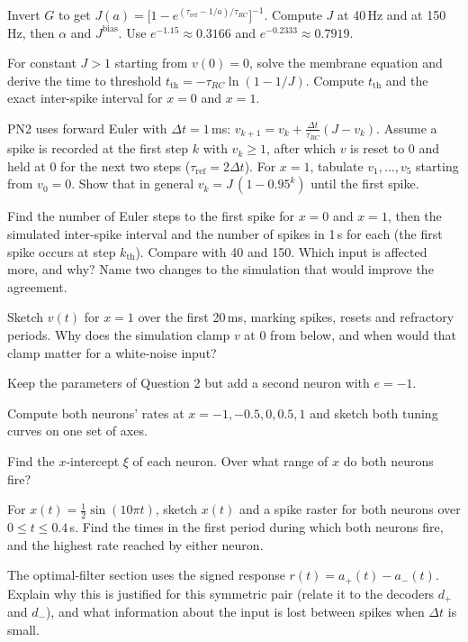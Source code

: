 \documentclass[10pt,letterpaper]{article}
\newcommand{\Jb}{J^{\mathrm{bias}}}
\newcommand{\tref}{\tau_{\mathrm{ref}}}
\newcommand{\trc}{\tau_{RC}}
\newcommand{\qsec}[1]{\vspace{8pt}{\large\bfseries #1}\par\vspace{2pt}}
\begin{document}
\begin{parts}
\item[2a.] Invert $G$ to get $J(a) = \big[1 - e^{(\tref - 1/a)/\trc}\big]^{-1}$. Compute $J$ at 40\,Hz and at 150\,Hz, then $\alpha$ and $\Jb$. Use $e^{-1.15} \approx 0.3166$ and $e^{-0.2333} \approx 0.7919$.

\item[2b.] For constant $J > 1$ starting from $v(0) = 0$, solve the membrane equation and derive the time to threshold $t_{\mathrm{th}} = -\trc\ln(1 - 1/J)$. Compute $t_{\mathrm{th}}$ and the exact inter-spike interval for $x = 0$ and $x = 1$.

\item[2c.] PN2 uses forward Euler with $\Delta t = 1$\,ms: $v_{k+1} = v_k + \frac{\Delta t}{\trc}(J - v_k)$. Assume a spike is recorded at the first step $k$ with $v_k \ge 1$, after which $v$ is reset to 0 and held at 0 for the next two steps ($\tref = 2\Delta t$). For $x = 1$, tabulate $v_1, \dots, v_5$ starting from $v_0 = 0$. Show that in general $v_k = J\,(1 - 0.95^k)$ until the first spike.

\item[2d.] Find the number of Euler steps to the first spike for $x = 0$ and $x = 1$, then the simulated inter-spike interval and the number of spikes in 1\,s for each (the first spike occurs at step $k_{\mathrm{th}}$). Compare with 40 and 150. Which input is affected more, and why? Name two changes to the simulation that would improve the agreement.

\item[2e.] Sketch $v(t)$ for $x = 1$ over the first 20\,ms, marking spikes, resets and refractory periods. Why does the simulation clamp $v$ at 0 from below, and when would that clamp matter for a white-noise input?
\end{parts}

\qsec{3. Two neurons with opposite encoders}
Keep the parameters of Question 2 but add a second neuron with $e = -1$.

\begin{parts}
\item[3a.] Compute both neurons' rates at $x = -1, -0.5, 0, 0.5, 1$ and sketch both tuning curves on one set of axes.

\item[3b.] Find the $x$-intercept $\xi$ of each neuron. Over what range of $x$ do both neurons fire?

\item[3c.] For $x(t) = \tfrac12\sin(10\pi t)$, sketch $x(t)$ and a spike raster for both neurons over $0 \le t \le 0.4$\,s. Find the times in the first period during which both neurons fire, and the highest rate reached by either neuron.

\item[3d.] The optimal-filter section uses the signed response $r(t) = a_{+}(t) - a_{-}(t)$. Explain why this is justified for this symmetric pair (relate it to the decoders $d_{+}$ and $d_{-}$), and what information about the input is lost between spikes when $\Delta t$ is small.
\end{parts}
\end{document}
